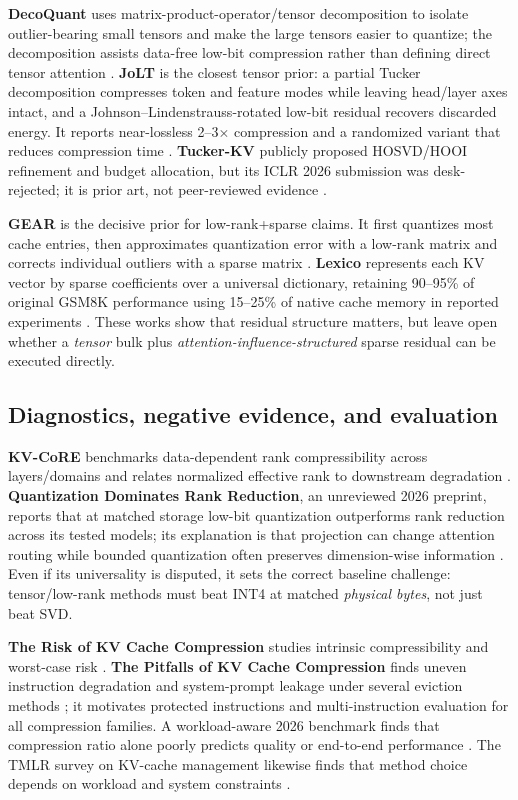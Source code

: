 \documentclass[10pt]{article}
\begin{document}
\textbf{DecoQuant} uses matrix-product-operator/tensor decomposition to isolate outlier-bearing
small tensors and make the large tensors easier to quantize; the decomposition assists
data-free low-bit compression rather than defining direct tensor attention \cite{decoquant}.
\textbf{JoLT} is the closest tensor prior: a partial Tucker decomposition compresses token and
feature modes while leaving head/layer axes intact, and a Johnson--Lindenstrauss-rotated low-bit
residual recovers discarded energy. It reports near-lossless 2--3$\times$ compression and a
randomized variant that reduces compression time \cite{jolt}. \textbf{Tucker-KV} publicly proposed
HOSVD/HOOI refinement and budget allocation, but its ICLR 2026 submission was desk-rejected;
it is prior art, not peer-reviewed evidence \cite{tuckerkv}.

\textbf{GEAR} is the decisive prior for low-rank+sparse claims. It first quantizes most cache
entries, then approximates quantization error with a low-rank matrix and corrects individual
outliers with a sparse matrix \cite{gear}. \textbf{Lexico} represents each KV vector by sparse
coefficients over a universal dictionary, retaining 90--95\% of original GSM8K performance using
15--25\% of native cache memory in reported experiments \cite{lexico}. These works show that
residual structure matters, but leave open whether a \emph{tensor} bulk plus
\emph{attention-influence-structured} sparse residual can be executed directly.

\subsection{Diagnostics, negative evidence, and evaluation}

\textbf{KV-CoRE} benchmarks data-dependent rank compressibility across layers/domains and relates
normalized effective rank to downstream degradation \cite{kvcore}. \textbf{Quantization Dominates
Rank Reduction}, an unreviewed 2026 preprint, reports that at matched storage low-bit quantization
outperforms rank reduction across its tested models; its explanation is that projection can change
attention routing while bounded quantization often preserves dimension-wise information
\cite{quantdom}. Even if its universality is disputed, it sets the correct baseline challenge:
tensor/low-rank methods must beat INT4 at matched \emph{physical bytes}, not just beat SVD.

\textbf{The Risk of KV Cache Compression} studies intrinsic compressibility and worst-case risk
\cite{riskkv}. \textbf{The Pitfalls of KV Cache Compression} finds uneven instruction degradation
and system-prompt leakage under several eviction methods \cite{pitfalls}; it motivates protected
instructions and multi-instruction evaluation for all compression families. A workload-aware 2026
benchmark finds that compression ratio alone poorly predicts quality or end-to-end performance
\cite{benchmark}. The TMLR survey on KV-cache management likewise finds that method choice depends
on workload and system constraints \cite{survey}.
\end{document}
